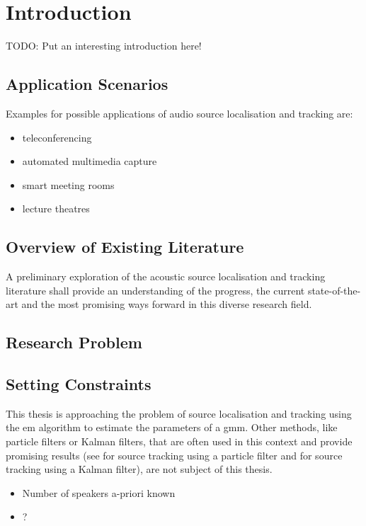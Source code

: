 \chapter{Introduction}
TODO: Put an interesting introduction here!
\section{Application Scenarios}
Examples for possible applications of audio source localisation and tracking are:
\begin{itemize}
\setlength\itemsep{0cm}
	\item teleconferencing
	\item automated multimedia capture
	\item smart meeting rooms
	\item lecture theatres \cite{Lehmann2007}
\end{itemize}

\section{Overview of Existing Literature}
A preliminary exploration of the acoustic source localisation and tracking literature shall provide an understanding of the progress, the current state-of-the-art and the most promising ways forward in this diverse research field. 


\section{Research Problem}
\section{Setting Constraints}
This thesis is approaching the problem of source localisation and tracking using the \gls{em} algorithm to estimate the parameters of a \gls{gmm}. Other methods, like particle filters or Kalman filters, that are often used in this context and provide promising results (see \cite{Lehmann2007} for source tracking using a particle filter and \cite{Gannot2012} for source tracking using a Kalman filter), are not subject of this thesis.
\begin{itemize}
	\item Number of speakers a-priori known
	\item ?
\end{itemize}
